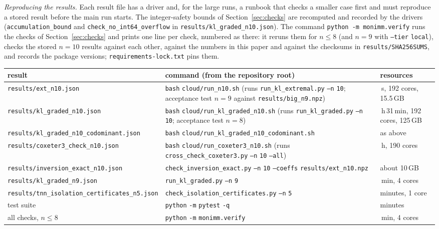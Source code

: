 \documentclass[11pt]{amsart}
\theoremstyle{definition}
\theoremstyle{remark}
\begin{document}
{\emph{Reproducing the results.} Each result file has a driver and, for the large runs, a runbook that checks a smaller case first and must reproduce a stored result before the main run starts. The integer-safety bounds of Section~\ref{sec:checks} are recomputed and recorded by the drivers (\nolinkurl{accumulation_bound} and \nolinkurl{check_no_int64_overflow} in \nolinkurl{results/kl_graded_n10.json}). The command \texttt{python -m monimm.verify} runs the checks of Section~\ref{sec:checks} and prints one line per check, numbered as there: it reruns them for $n\le8$ (and $n=9$ with \texttt{--tier} \texttt{local}), checks the stored $n=10$ results against each other, against the numbers in this paper and against the checksums in \nolinkurl{results/SHA256SUMS}, and records the package versions; \nolinkurl{requirements-lock.txt} pins them.
\begin{center}
\footnotesize
\begin{tabular}{>{\raggedright\arraybackslash}p{4.3cm}>{\raggedright\arraybackslash}p{6.9cm}>{\raggedright\arraybackslash}p{2.6cm}}
\toprule
result & command (from the repository root) & resources\\
\midrule
\nolinkurl{results/ext_n10.json} & \texttt{bash} \nolinkurl{cloud/run_n10.sh} (runs \nolinkurl{run_kl_extremal.py} \texttt{--n} \texttt{10}; acceptance test $n=9$ against \nolinkurl{results/big_n9.npz}) & 279\,s, 192 cores, 15.5\,GB\\
\nolinkurl{results/kl_graded_n10.json} & \texttt{bash} \nolinkurl{cloud/run_kl_graded_n10.sh} (runs \nolinkurl{run_kl_graded.py} \texttt{--n} \texttt{10}; acceptance test $n=8$) & 1\,h\,31\,min, 192 cores, 125\,GB\\
\nolinkurl{results/kl_graded_n10_codominant.json} & \texttt{bash} \nolinkurl{cloud/run_kl_graded_n10_codominant.sh} & as above\\
\nolinkurl{results/coxeter3_check_n10.json} & \texttt{bash} \nolinkurl{cloud/run_coxeter3_n10.sh} (runs \nolinkurl{cross_check_coxeter3.py} \texttt{--n} \texttt{10} \texttt{--all}) & 2.4\,h, 190 cores\\
\nolinkurl{results/inversion_exact_n10.json} & \nolinkurl{check_inversion_exact.py} \texttt{--n} \texttt{10} \texttt{--coeffs} \nolinkurl{results/ext_n10.npz} & about 10\,GB\\
\nolinkurl{results/kl_graded_n9.json} & \nolinkurl{run_kl_graded.py} \texttt{--n} \texttt{9} & 25\,min, 4 cores\\
\nolinkurl{results/tnn_isolation_certificates_n5.json} & \nolinkurl{check_isolation_certificates.py} \texttt{--n} \texttt{5} & minutes, 1 core\\
test suite & \texttt{python} \texttt{-m} \texttt{pytest} \texttt{-q} & minutes\\
all checks, $n\le8$ & \texttt{python} \texttt{-m} \nolinkurl{monimm.verify} & 3\,min, 4 cores\\
\bottomrule
\end{tabular}
\end{center}
\par}
\end{document}
